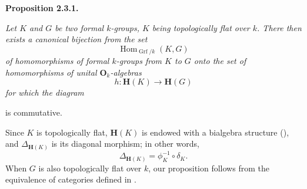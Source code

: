 
\medskip
\noindent\textbf{Proposition 2.3.1.}
\label{sga3:VIIB:2.3.1}
{\itshape Let \(K\) and \(G\) be two formal \(k\)-groups, \(K\) being
topologically flat over \(k\). There then exists a canonical bijection
from the set
\[
  \operatorname{Hom}_{\operatorname{Grf}/k}(K,G)
\]
of homomorphisms of formal \(k\)-groups from \(K\) to \(G\) onto the set of homomorphisms of unital \(\mathbf O_k\)-algebras
\[
  h:\mathbf H(K)\longrightarrow\mathbf H(G)
\]
for which the diagram
\begin{center}
  \label{sga3:VIIB:2.3.1:compatibility-diagram}
  
\end{center}
is commutative.}

Since \(K\) is topologically flat, \(\mathbf H(K)\) is endowed with a
bialgebra structure \textup{()}, and \(\Delta_{\mathbf H(K)}\) is its
diagonal morphism; in other words,
\[
  \Delta_{\mathbf H(K)}=\phi_K^{-1}\circ\delta_K.
\]
When \(G\) is also topologically flat over \(k\), our proposition
follows from the equivalence of categories defined in .

